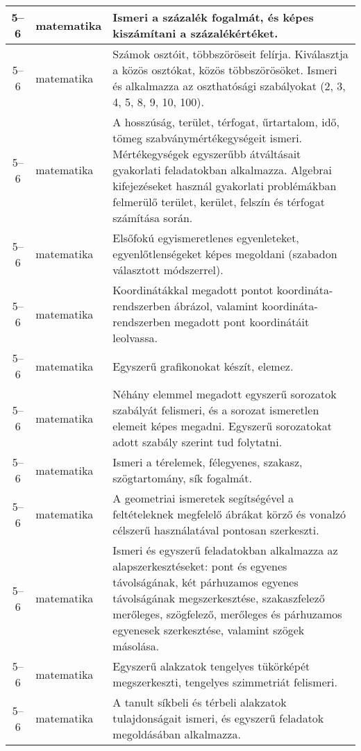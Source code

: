 \begin{small}
\begin{longtable}{c | p{2cm} |  p{11cm} }
              5--6 & matematika & Ismeri a százalék fogalmát, és képes kiszámítani a százalékértéket. \\ \hline
              5--6 & matematika & Számok osztóit, többszöröseit felírja. Kiválasztja a közös osztókat, közös többszörösöket. Ismeri és alkalmazza az oszthatósági szabályokat (2, 3, 4, 5, 8, 9, 10, 100). \\ \hline
              5--6 & matematika & A hosszúság, terület, térfogat, űrtartalom, idő, tömeg szabványmértékegységeit ismeri. Mértékegységek egyszerűbb átváltásait gyakorlati feladatokban alkalmazza. Algebrai kifejezéseket használ gyakorlati problémákban felmerülő  terület, kerület, felszín és térfogat számítása során. \\ \hline
              5--6 & matematika & Elsőfokú egyismeretlenes egyenleteket, egyenlőtlenségeket képes megoldani (szabadon választott módszerrel). \\ \hline
              5--6 & matematika & Koordinátákkal megadott pontot koordináta-rendszerben ábrázol, valamint koordináta-rendszerben megadott pont koordinátáit leolvassa. \\ \hline
              5--6 & matematika & Egyszerű grafikonokat készít, elemez. \\ \hline
              5--6 & matematika & Néhány elemmel megadott egyszerű sorozatok szabályát felismeri, és a sorozat ismeretlen elemeit képes megadni. Egyszerű sorozatokat adott szabály szerint tud folytatni. \\ \hline
              5--6 & matematika & Ismeri a térelemek, félegyenes, szakasz, szögtartomány, sík fogalmát. \\ \hline
              5--6 & matematika & A geometriai ismeretek segítségével a feltételeknek megfelelő ábrákat körző és vonalzó célszerű használatával pontosan szerkeszti. \\ \hline
              5--6 & matematika & Ismeri és egyszerű feladatokban alkalmazza az alapszerkesztéseket: pont és egyenes távolságának, két párhuzamos egyenes távolságának megszerkesztése, szakaszfelező merőleges, szögfelező, merőleges és párhuzamos egyenesek szerkesztése, valamint szögek másolása. \\ \hline
              5--6 & matematika & Egyszerű alakzatok tengelyes tükörképét megszerkeszti, tengelyes szimmetriát felismeri. \\ \hline
              5--6 & matematika & A tanult síkbeli és térbeli alakzatok tulajdonságait ismeri, és egyszerű feladatok megoldásában alkalmazza. \\ \hline

\end{longtable}
\end{small}
